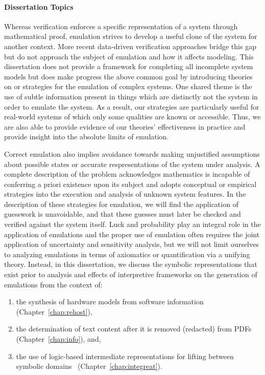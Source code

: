 \paragraph{Dissertation Topics}
Whereas verification enforces a specific representation of a system through mathematical proof, emulation strives to develop a useful clone of the system for another context.
More recent data-driven verification approaches bridge this gap but do not approach the subject of emulation and how it affects modeling.
This dissertation does not provide a framework for completing all incomplete system models but does make progress the above common goal by introducing theories on or strategies for the emulation of complex systems.
One shared theme is the use of subtle information present in things which are distinctly not the system in order to emulate the system.
As a result, our strategies are particularly useful for real-world systems of which only some qualities are known or accessible.
Thus, we are also able to provide evidence of our theories' effectiveness in practice and provide insight into the absolute limits of emulation.

Correct emulation also implies avoidance towards making unjustified assumptions about possible states or accurate respresentations of the system under analysis.
A complete description of the problem acknowledges mathematics is incapable of conferring a priori existence upon its subject and adopts conceptual or empirical strategies into the execution and analysis of unknown system features.
In the description of these strategies for emulation, we will find the application of guesswork is unavoidable, and that these guesses must later be checked and verified against the system itself.
Luck and probability play an integral role in the application of emulations and the proper use of emulation often requires the joint application of uncertainty and sensitivity analysis, but we will not limit ourselves to analyzing emulations in terms of axiomatics or quantification via a unifying theory.
Instead, in this dissertation, we discuss the symbolic representations that exist prior to analysis and effects of interpretive frameworks on the generation of emulations from the context of:

\begin{enumerate}
	\item the synthesis of hardware models from software information~\cite{johnson2021jetset} (Chapter~\ref{chap:rehost}),
	\item the determination of text content after it is removed (redacted) from PDFs~\cite{bland2023story} (Chapter~\ref{chap:info}), and,
	\item the use of logic-based intermediate representations for lifting between symbolic domains~\cite{bland2023integreat} (Chapter~\ref{chap:integreat}).
\end{enumerate}

